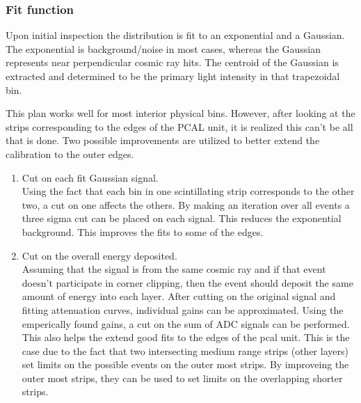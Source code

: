 \FloatBarrier
\subsubsection{Fit function}
Upon initial inspection the distribution is fit to an exponential and a Gaussian. 
The exponential is background/noise in most cases, whereas the Gaussian represents near perpendicular cosmic ray hits. 
The centroid of the Gaussian is extracted and determined to be the primary light intensity in that trapezoidal bin.

This plan works well for most interior physical bins. However, after looking at the strips corresponding to 
the edges of the PCAL unit, it is realized this can't be all that is done. Two possible improvements are 
utilized to better extend the calibration to the outer edges.

\begin{enumerate}
    \item Cut on each fit Gaussian signal. \\
        Using the fact that each bin in one scintillating strip corresponds to the other two, a cut on one 
        affects the others. By making an iteration over all events a three sigma cut can be placed on each
         signal. This reduces the exponential background. This improves the fits to some of the edges.
    \item Cut on the overall energy deposited. \\
        Assuming that the signal is from the same cosmic ray and if that event doesn't participate in 
        corner clipping, then the event should deposit the same amount of energy into each layer. After
         cutting on the original signal and fitting attenuation curves, individual gains can be 
         approximated. Using the emperically found gains, a cut on the sum of ADC signals can be 
         performed. This also helps the extend good fits to the edges of the pcal unit. This is 
         the case due to the fact that two intersecting medium range strips (other layers) set 
         limits on the possible events on the outer most strips. By improveing the outer most strips,
          they can be used to set limits on the overlapping shorter strips.  
\end{enumerate}

\FloatBarrier
